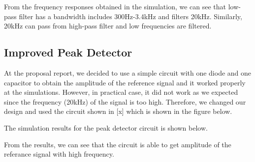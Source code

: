 \documentclass[conference]{IEEEtran}
\begin{document}
From the frequency responses obtained in the simulation, we can see that low-pass filter has a bandwidth includes 300Hz-3.4kHz and filters 20kHz. 
Similarly, 20kHz can pass from high-pass filter and low frequencies are filtered. 

\subsection{Improved Peak Detector}
At the proposal report, we decided to use a simple circuit with one diode and one capacitor to obtain the amplitude 
of the reference signal and it worked properly at the simulations. However, in practical case, it did not work as we expected 
since the frequency (20kHz) of the signal is too high. Therefore, we changed our design and used the circuit shown in [x] which is 
shown in the figure below.

The simulation results for the peak detector circuit is shown below.

From the results, we can see that the circuit is able to get amplitude of the referance signal with high frequency.
\end{document}
